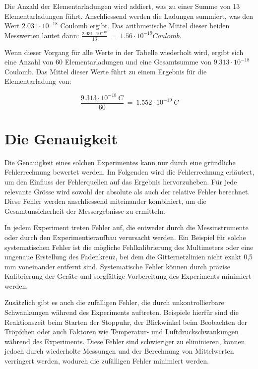 \par
\noindent Die Anzahl der Elementarladungen wird addiert, was zu einer Summe von 13 Elementarladungen führt. Anschliessend werden die Ladungen summiert, was den Wert $2.031 \cdot 10^{-18}$ Coulomb ergibt. Das arithmetische Mittel dieser beiden Messwerten lautet dann: $\frac{2.031 \cdot 10^{-18}}{13} \ = \ 1.56 \cdot 10^{-19} Coulomb$. 

Wenn dieser Vorgang für alle Werte in der Tabelle wiederholt wird, ergibt sich eine Anzahl von 60 Elementarladungen und eine Gesamtsumme von $9.313 \cdot 10^{-18}$ Coulomb. Das Mittel dieser Werte führt zu einem Ergebnis für die Elementarladung von:

\begin{equation}\label{eq:ergebnis}
	\frac{9.313 \cdot 10^{-18}\ C}{60} \ = \ 1.552 \cdot 10^{-19}\ C
\end{equation}

\section{Die Genauigkeit}\label{sec:genauigkeitAuswertung}
Die Genauigkeit eines solchen Experimentes kann nur durch eine gründliche Fehlerrechnung bewertet werden. Im Folgenden wird die Fehlerrechnung erläutert, um den Einfluss der Fehlerquellen auf das Ergebnis hervorzuheben. Für jede relevante Grösse wird sowohl der absolute als auch der relative Fehler berechnet. Diese Fehler werden anschliessend miteinander kombiniert, um die Gesamtunsicherheit der Messergebnisse zu ermitteln.

In jedem Experiment treten Fehler auf, die entweder durch die Messinstrumente oder durch den Experimentieraufbau verursacht werden. Ein Beispiel für solche systematischen Fehler ist die mögliche Fehlkalibrierung des Multimeters oder eine ungenaue Erstellung des Fadenkreuz, bei dem die Gitternetzlinien nicht exakt 0,5 mm voneinander entfernt sind. Systematische Fehler können durch präzise Kalibrierung der Geräte und sorgfältige Vorbereitung des Experiments minimiert werden.

Zusätzlich gibt es auch die zufälligen Fehler, die durch unkontrollierbare Schwankungen während des Experiments auftreten. Beispiele hierfür sind die Reaktionszeit beim Starten der Stoppuhr, der Blickwinkel beim Beobachten der Tröpfchen oder auch Faktoren wie Temperatur- und Luftdruckschwankungen während des Experiments. Diese Fehler sind schwieriger zu eliminieren, können jedoch durch wiederholte Messungen und der Berechnung von Mittelwerten verringert werden, wodurch die zufälligen Fehler minimiert werden.

